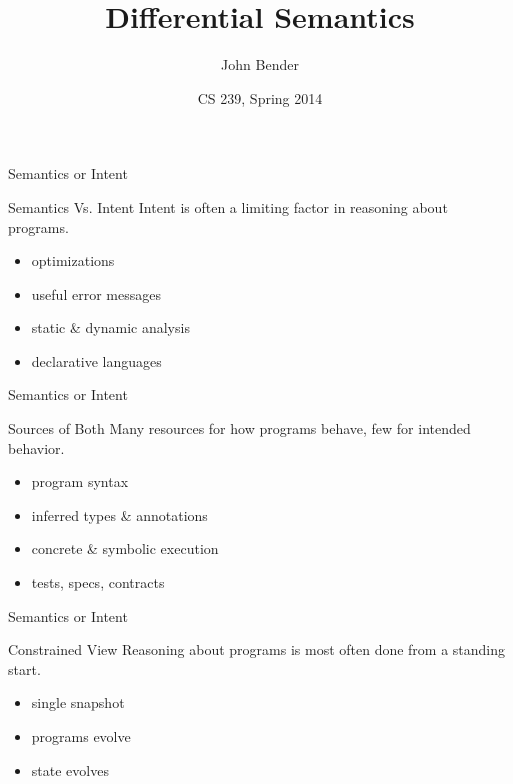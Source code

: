 \documentclass{beamer}
\title{Differential Semantics}
\subtitle{}
\author{John Bender}
\date{CS 239, Spring 2014}
\begin{document}
\setlength{\abovedisplayskip}{0pt}
\setlength{\belowdisplayskip}{0pt}
\setlength{\abovedisplayshortskip}{0pt}
\setlength{\belowdisplayshortskip}{0pt}

\begin{frame}
  \titlepage
\end{frame}

\begin{frame}{Semantics or Intent}
  \begin{block}{Semantics Vs. Intent}
    Intent is often a limiting factor in reasoning about programs.

    \begin{itemize}
      \item optimizations
      \item useful error messages
      \item static \& dynamic analysis
      \item declarative languages
  \end{itemize}
  \end{block}
\end{frame}

\begin{frame}{Semantics or Intent}
  \begin{block}{Sources of Both}
    Many resources for how programs behave, few for intended behavior.

    \begin{itemize}
      \item program syntax
      \item inferred types \& annotations
      \item concrete \& symbolic execution
      \item tests, specs, contracts
  \end{itemize}
  \end{block}
\end{frame}

\begin{frame}{Semantics or Intent}
  \begin{block}{Constrained View}
    Reasoning about programs is most often done from a standing start.

    \begin{itemize}
      \item single snapshot
      \item programs evolve
      \item state evolves
  \end{itemize}
  \end{block}
\end{frame}
\end{document}
